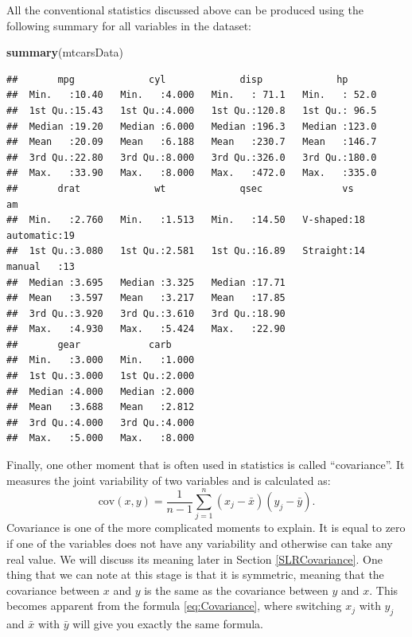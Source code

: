 \documentclass[
]{book}
\newenvironment{Shaded}{\begin{snugshade}}{\end{snugshade}}
\newcommand{\FunctionTok}[1]{\textcolor[rgb]{0.13,0.29,0.53}{\textbf{#1}}}
\newcommand{\NormalTok}[1]{#1}
\theoremstyle{definition}
\theoremstyle{definition}
\theoremstyle{definition}
\theoremstyle{definition}
\theoremstyle{remark}
\begin{document}
All the conventional statistics discussed above can be produced using the following summary for all variables in the dataset:

\begin{Shaded}
\begin{Highlighting}[]
\FunctionTok{summary}\NormalTok{(mtcarsData)}
\end{Highlighting}
\end{Shaded}

\begin{verbatim}
##       mpg             cyl             disp             hp       
##  Min.   :10.40   Min.   :4.000   Min.   : 71.1   Min.   : 52.0  
##  1st Qu.:15.43   1st Qu.:4.000   1st Qu.:120.8   1st Qu.: 96.5  
##  Median :19.20   Median :6.000   Median :196.3   Median :123.0  
##  Mean   :20.09   Mean   :6.188   Mean   :230.7   Mean   :146.7  
##  3rd Qu.:22.80   3rd Qu.:8.000   3rd Qu.:326.0   3rd Qu.:180.0  
##  Max.   :33.90   Max.   :8.000   Max.   :472.0   Max.   :335.0  
##       drat             wt             qsec              vs             am    
##  Min.   :2.760   Min.   :1.513   Min.   :14.50   V-shaped:18   automatic:19  
##  1st Qu.:3.080   1st Qu.:2.581   1st Qu.:16.89   Straight:14   manual   :13  
##  Median :3.695   Median :3.325   Median :17.71                               
##  Mean   :3.597   Mean   :3.217   Mean   :17.85                               
##  3rd Qu.:3.920   3rd Qu.:3.610   3rd Qu.:18.90                               
##  Max.   :4.930   Max.   :5.424   Max.   :22.90                               
##       gear            carb      
##  Min.   :3.000   Min.   :1.000  
##  1st Qu.:3.000   1st Qu.:2.000  
##  Median :4.000   Median :2.000  
##  Mean   :3.688   Mean   :2.812  
##  3rd Qu.:4.000   3rd Qu.:4.000  
##  Max.   :5.000   Max.   :8.000
\end{verbatim}

Finally, one other moment that is often used in statistics is called ``covariance''. It measures the joint variability of two variables and is calculated as:
\begin{equation}
    \mathrm{cov}(x,y)= \frac{1}{n-1}\sum_{j=1}^n (x_j - \bar{x}) (y_j - \bar{y}) .
    \label{eq:Covariance}
\end{equation}
Covariance is one of the more complicated moments to explain. It is equal to zero if one of the variables does not have any variability and otherwise can take any real value. We will discuss its meaning later in Section \ref{SLRCovariance}. One thing that we can note at this stage is that it is symmetric, meaning that the covariance between \(x\) and \(y\) is the same as the covariance between \(y\) and \(x\). This becomes apparent from the formula \eqref{eq:Covariance}, where switching \(x_j\) with \(y_j\) and \(\bar{x}\) with \(\bar{y}\) will give you exactly the same formula.
\end{document}
